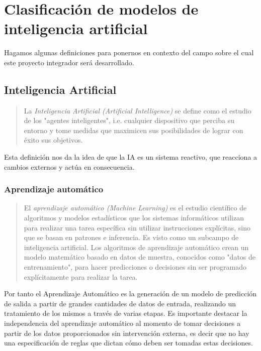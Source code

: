 \documentclass[a4paper,12pt]{article}
\begin{document}
\section{Clasificación de modelos de inteligencia artificial}

Hagamos algunas definiciones para ponernos en contexto del campo sobre el cual este proyecto integrador será desarrollado.

\subsection{Inteligencia Artificial}

\begin{quote}
	La \textit{Inteligencia Artificial (Artificial Intelligence)} se define como el estudio de los "agentes inteligentes", i.e. cualquier dispositivo que perciba su entorno y tome medidas que maximicen sus posibilidades de lograr con éxito sus objetivos.
	  
	\hfill \citet{poole1998}
\end{quote}

Esta definición nos da la idea de que la IA es un sistema reactivo, que reacciona a cambios externos y actúa en consecuencia.

\subsubsection{Aprendizaje automático} \label{machinelearning}

\begin{quote}
	El \textit{aprendizaje automático (Machine Learning)} es el estudio científico de algoritmos y modelos estadísticos que los sistemas informáticos utilizan para realizar una tarea específica sin utilizar instrucciones explícitas, sino que se basan en patrones e inferencia. Es visto como un subcampo de inteligencia artificial. Los algoritmos de aprendizaje automático crean un modelo matemático basado en datos de muestra, conocidos como "datos de entrenamiento", para hacer predicciones o decisiones sin ser programado explícitamente para realizar la tarea.
	  
	\hfill \citet{bishop2006pattern}
\end{quote}

Por tanto el Aprendizaje Automático es la generación de un modelo de predicción de salida a partir de grandes cantidades de datos de entrada, realizando un tratamiento de los mismos a través de varias etapas. Es importante destacar la independencia del aprendizaje automático al momento de tomar decisiones a partir de los datos proporcionados sin intervención externa, es decir que no hay una especificación de reglas que dictan cómo deben ser tomadas estas decisiones.
\end{document}
